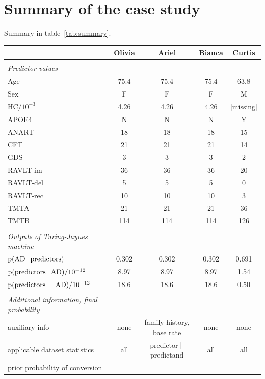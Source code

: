 \documentclass[utf8]{FrontiersinHarvard} %
\newcommand*{\p}{\mathrm{p}}%
\renewcommand*{\|}[1][]{\nonscript\:#1\vert\nonscript\:\mathopen{}}
\newcommand*{\tjm}{Turing-Jaynes machine}
\newcommand*{\AD}{\mathrm{AD}}
\newcommand*{\nAD}{\lnot\mathrm{AD}}
\begin{document}
\section{Summary of the case study}
\label{sec:summary}


Summary in table~\ref{tab:summary}.

\begin{table}[!t]
  \centering
  \begin{tabular}{lcccc}
    &{\small Olivia} &{\small Ariel} &{\small Bianca} &{\small Curtis}
    \\[\jot]
    \hline\\[-1.5\jot]
    \emph{\small Predictor values}&&&& \\[\jot]
    Age&75.4&75.4&75.4&63.8 \\
    Sex&F&F&F&M \\
    HC${}/10^{-3}$&4.26&4.26&4.26&[missing] \\
    APOE4&N&N&N&Y \\
    ANART&18&18&18&15 \\
    CFT&21&21&21&14 \\
    GDS&3&3&3&2 \\
    RAVLT-im&36&36&36&20 \\
    RAVLT-del&5&5&5&0 \\
    RAVLT-rec&10&10&10&3 \\
    TMTA&21&21&21&36 \\
    TMTB&114&114&114&126
    \\[2\jot] \hline\\
    \emph{\small Outputs of \tjm}&&&& \\[\jot]
    {\small $\p(\AD \| \text{predictors})$}&
    0.302&0.302&0.302&0.691
    \\
    {\small $\p(\text{predictors} \| \AD)/10^{-12}$}&
    8.97&8.97&8.97&1.54
    \\
    {\small $\p(\text{predictors} \| \nAD)/10^{-12}$}&
    18.6&18.6&18.6&0.50
    \\[2\jot] \hline\\
    \emph{\small Additional information, final probability}&&&& \\[\jot]
    {\small auxiliary info}&
    {\small none}&
    {\small family history, base rate}&
    {\small none}&
    {\small none}\\
    {\small applicable dataset statistics}&
    {\small all}&
    {\small predictor$\|$predictand}&
    {\small all}&
    {\small all}\\
    {\small prior probability of conversion}&

\end{tabular}
\end{table}
\end{document}
